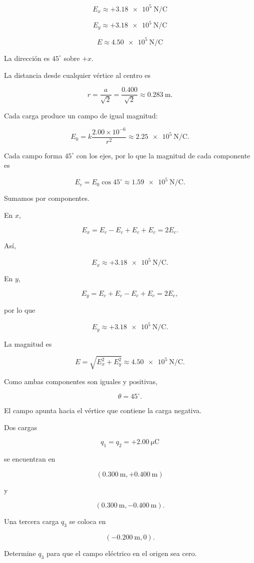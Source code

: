 \begin{respuesta}

\[
\boxed{E_x\approx+\SI{3.18e5}{\newton\per\coulomb}}
\]

\[
\boxed{E_y\approx+\SI{3.18e5}{\newton\per\coulomb}}
\]

\[
\boxed{E\approx\SI{4.50e5}{\newton\per\coulomb}}
\]

La dirección es \(45^\circ\) sobre \(+x\).

\end{respuesta}

\begin{explicacion}

La distancia desde cualquier vértice al centro es

\[
r=\frac{a}{\sqrt2}
=\frac{0.400}{\sqrt2}
\approx\SI{0.283}{\metre}.
\]

Cada carga produce un campo de igual magnitud:

\[
E_0=k\frac{2.00\times10^{-6}}{r^2}
\approx\SI{2.25e5}{\newton\per\coulomb}.
\]

Cada campo forma \(45^\circ\) con los ejes, por lo que la magnitud de cada componente es

\[
E_c=E_0\cos45^\circ
\approx\SI{1.59e5}{\newton\per\coulomb}.
\]

Sumamos por componentes.

En \(x\),

\[
E_x=E_c-E_c+E_c+E_c=2E_c.
\]

Así,

\[
E_x\approx+\SI{3.18e5}{\newton\per\coulomb}.
\]

En \(y\),

\[
E_y=E_c+E_c-E_c+E_c=2E_c,
\]

por lo que

\[
E_y\approx+\SI{3.18e5}{\newton\per\coulomb}.
\]

La magnitud es

\[
E=\sqrt{E_x^2+E_y^2}
\approx\SI{4.50e5}{\newton\per\coulomb}.
\]

Como ambas componentes son iguales y positivas,

\[
\boxed{\theta=45^\circ}.
\]

El campo apunta hacia el vértice que contiene la carga negativa.

\end{explicacion}


\begin{ejercicio}

Dos cargas

\[
q_1=q_2=+\SI{2.00}{\micro\coulomb}
\]

se encuentran en

\[
(\SI{0.300}{\metre},+\SI{0.400}{\metre})
\]

y

\[
(\SI{0.300}{\metre},-\SI{0.400}{\metre}).
\]

Una tercera carga \(q_3\) se coloca en

\[
(-\SI{0.200}{\metre},0).
\]

Determine \(q_3\) para que el campo eléctrico en el origen sea cero.

\end{ejercicio}

